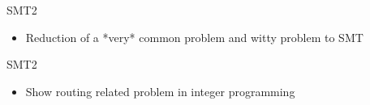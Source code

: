 \documentclass[9pt]{beamer}
\begin{document}
\begin{frame}{SMT2}
	\begin{itemize}
        \setlength\itemsep{1em}
		\item Reduction of a *very* common problem and witty problem to SMT
	\end{itemize}
\end{frame}

\begin{frame}{SMT2}
	\begin{itemize}
        \setlength\itemsep{1em}
		\item Show routing related problem in integer programming
	\end{itemize}
\end{frame}
\end{document}
